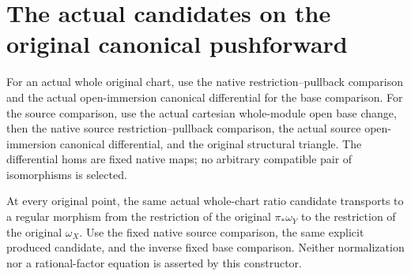 \section{The actual candidates on the original canonical pushforward}

\begin{definition}
\label{def:kn-canonical-whole-chart-fixed-native-comparisons}
\leanok
For an actual whole original chart, use the native restriction--pullback
comparison and the actual open-immersion canonical differential for the
base comparison. For the source comparison, use the actual cartesian
whole-module open base change, then the native source restriction--pullback
comparison, the actual source open-immersion canonical differential, and
the original structural triangle. The differential homs are fixed native
maps; no arbitrary compatible pair of isomorphisms is selected.
\end{definition}

\begin{definition}
\label{def:kn-canonical-every-point-original-pushforward-candidate}
\leanok
At every original point, the same actual whole-chart ratio candidate
transports to a regular morphism from the restriction of the original
$\pi_*\omega_Y$ to the restriction of the original $\omega_X$.
Use the fixed native source comparison, the same explicit produced
candidate, and the inverse fixed base comparison. Neither normalization
nor a rational-factor equation is asserted by this constructor.
\end{definition}
